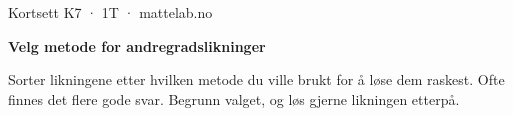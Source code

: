 \documentclass[11pt,a4paper]{article}
\begin{document}
\begin{minipage}[t]{0.8\linewidth}\vspace{0pt}
{\sffamily\small\color{dempet}Kortsett K7 · 1T · mattelab.no}\par\vspace{0.25em}
{\fontsize{20}{24}\selectfont\bfseries Velg metode for andregradslikninger}\par\vspace{0.5em}
Sorter likningene etter hvilken metode du ville brukt for å løse dem raskest. Ofte finnes det flere gode svar. Begrunn valget, og løs gjerne likningen etterpå.\par{}
\end{minipage}\hfill
\begin{minipage}[t]{0.15\linewidth}\vspace{0pt}\raggedleft
{}
\end{minipage}\par\vspace{0.8em}
\end{document}

